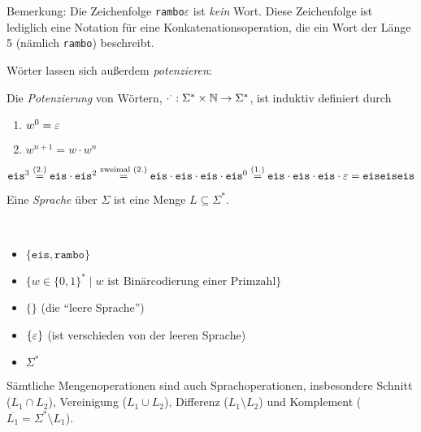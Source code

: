 Bemerkung: Die Zeichenfolge \texttt{rambo}$\varepsilon$ ist \emph{kein} Wort.
Diese Zeichenfolge ist lediglich eine Notation für eine Konkatenationsoperation, die ein Wort der Länge 5 (nämlich \texttt{rambo}) beschreibt.

Wörter lassen sich außerdem \emph{potenzieren}:
\begin{Def}
  Die \emph{Potenzierung} von Wörtern, $\cdot ^ \cdot: \Sigma^*\times \mathbb{N} \to \Sigma^*$, ist induktiv definiert durch
  \begin{enumerate}
  \item $w^0 = \varepsilon$ 
  \item $w^{n+1} = w \cdot w^n$
  \qedhere
  \end{enumerate}
\end{Def}
\begin{Bsp*} $\mathtt{eis}^3 
\stackrel{(2.)}{=} \mathtt{eis}\cdot\mathtt{eis}^2 
\stackrel{\text{zweimal } (2.)}{=} \mathtt{eis}\cdot\mathtt{eis}\cdot\mathtt{eis}\cdot\mathtt{eis}^0
\stackrel{(1.)}{=} \mathtt{eis}\cdot\mathtt{eis}\cdot\mathtt{eis}\cdot\varepsilon
= \mathtt{eiseiseis}
$
\end{Bsp*}

\begin{Def}[name={[Sprache über $\Sigma$]}]
	Eine \emph{Sprache} über $\Sigma$ ist eine Menge $L\subseteq\Sigma^*$.
\end{Def}

\goodbreak

\begin{Bsp*}~ 
  \begin{itemize}
  \item 
	$\{\mathtt{eis}, \mathtt{rambo}\}$
  \item
    $\{w\in\{0,1\}^*\mid w \text{ ist Binärcodierung einer Primzahl}\}$
  \item $\{\}$ (die "`leere Sprache"')
  \item $\{ \varepsilon \}$ (ist verschieden von der leeren Sprache)
  \item $\Sigma^*$
  \qedhere
  \end{itemize}
\end{Bsp*}
Sämtliche Mengenoperationen sind auch Sprachoperationen, insbesondere Schnitt ($L_1 \cap L_2$), Vereinigung ($L_1 \cup L_2$), Differenz ($L_1 \setminus L_2$) und Komplement ($\overline{L_1} = \Sigma^* \setminus L_1$).

